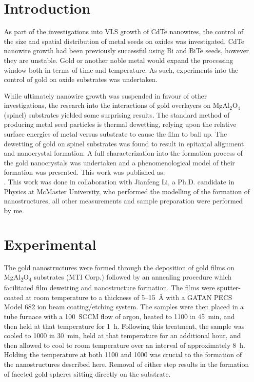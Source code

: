 \section{Introduction}
As part of the investigations into VLS growth of CdTe nanowires, the control of the size and spatial distribution of metal seeds on oxides was investigated.
CdTe nanowire growth had been previously successful using Bi and BiTe seeds, however they are unstable. Gold or another noble metal would expand the processing window both in terms of time and temperature.
As such, experiments into the control of gold on oxide substrates was undertaken.

While ultimately nanowire growth was suspended in favour of other investigations, the research into the interactions of gold overlayers on MgAl\(_2\)O\(_4\) (spinel) substrates yielded some surprising results.
The standard method of producing metal seed particles is thermal dewetting, relying upon the relative surface energies of metal versus substrate to cause the film to ball up.
The dewetting of gold on spinel substrates was found to result in epitaxial alignment and nanocrystal formation.
A full characterization into the formation process of the gold nanocrystals was undertaken and a phenomenological model of their formation was presented.
This work was published as:\\
 \cite{Devenyi2009}.
This work was done in collaboration with Jianfeng Li, a Ph.D. candidate in Physics at McMaster University, who performed the modelling of the formation of nanostructures, all other measurements and sample preparation were performed by me.
\section{Experimental}
The gold nanostructures were formed through the deposition of gold films on MgAl\textsubscript{2}O\textsubscript{4} substrates (MTI Corp.) followed by an annealing procedure which facilitated film dewetting and nanostructure formation.
The films were sputter-coated at room temperature to a thickness of 5--15~\AA{} with a GATAN PECS Model 682 ion beam coating/etching system.
The samples were then placed in a tube furnace with a 100~SCCM flow of argon, heated to 1100\celsius{} in 45~min, and then held at that temperature for 1~h.
Following this treatment, the sample was cooled to 1000\celsius{} in 30~min, held at that temperature for an additional hour, and then allowed to cool to room temperature over an interval of approximately 8~h.
Holding the temperature at both 1100 and 1000\celsius{} was crucial to the formation of the nanostructures described here.
Removal of either step results in the formation of faceted gold spheres sitting directly on the substrate.

